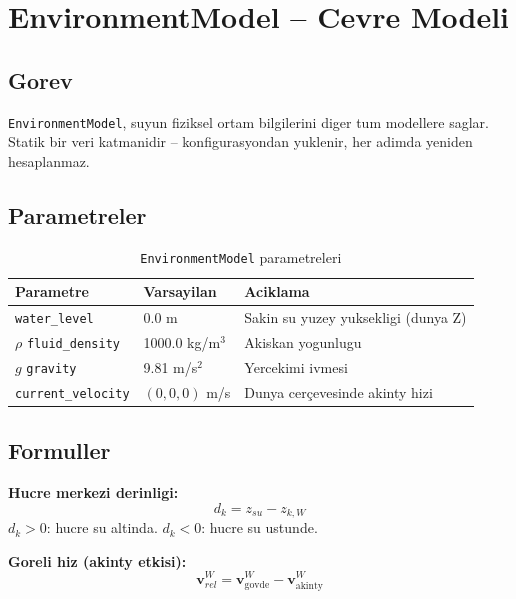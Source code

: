 \documentclass[12pt,a4paper]{article}
\begin{document}
\newpage
\section{EnvironmentModel -- Cevre Modeli}

\subsection{Gorev}

\texttt{EnvironmentModel}, suyun fiziksel ortam bilgilerini diger tum
modellere saglar. Statik bir veri katmanidir -- konfigurasyondan yuklenir,
her adimda yeniden hesaplanmaz.

\subsection{Parametreler}

\begin{table}[H]
  \centering
  \caption{\texttt{EnvironmentModel} parametreleri}
  \begin{tabularx}{\linewidth}{llX}
    \toprule
    \textbf{Parametre} & \textbf{Varsayilan} & \textbf{Aciklama} \\
    \midrule
    \texttt{water\_level} & 0.0 m & Sakin su yuzey yuksekligi (dunya Z) \\
    $\rho$ \texttt{fluid\_density} & 1000.0 kg/m$^3$ & Akiskan yogunlugu \\
    $g$ \texttt{gravity} & 9.81 m/s$^2$ & Yercekimi ivmesi \\
    \texttt{current\_velocity} & $(0,0,0)$ m/s & Dunya cerçevesinde akinty hizi \\
    \bottomrule
  \end{tabularx}
\end{table}

\subsection{Formuller}

\textbf{Hucre merkezi derinligi:}
\begin{equation}
  d_k = z_{su} - z_{k,W}
  \label{eq:depth}
\end{equation}
$d_k > 0$: hucre su altinda.  $d_k < 0$: hucre su ustunde.

\textbf{Goreli hiz (akinty etkisi):}
\begin{equation}
  \mathbf{v}_{rel}^W = \mathbf{v}_{\text{govde}}^W - \mathbf{v}_{\text{akinty}}^W
  \label{eq:rel_vel}
\end{equation}
\end{document}
